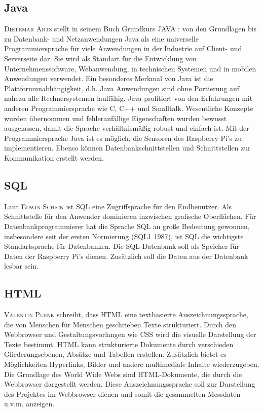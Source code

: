 \subsection{Java}\label{Java}

\textsc{Dietemar Abts} stellt in seinem Buch Grundkurs JAVA : von den Grundlagen bis zu Datenbank- und Netzanwendungen \cite{abts2015grundkurs} Java als eine universelle Programmiersprache für viele Anwendungen in der Industrie auf Client- und Serverseite dar.
Sie wird als Standart für die Entwicklung von Unternehmenssoftware, Webanwendung, in technischen Systemen und in mobilen Anwendungen verwendet.
Ein besonderes Merkmal von Java ist die Plattformunabhängigkeit, d.h. Java Anwendungen sind ohne Portierung auf nahezu alle Rechnersystemen 
lauffähig. Java profitiert von den Erfahrungen mit anderen Programmiersprache wie C, C++ und Smalltalk. Wesentliche Konzepte wurden übernommen und fehleranfällige Eigenschaften wurden bewusst ausgelassen, damit die Sprache verhältnismäßig robust und einfach ist. Mit der Programmiersprache Java ist es möglich, die Sensoren des Raspberry Pi's zu implementieren. Ebenso können Datenbankschnittstellen und Schnittstellen zur Kommunikation erstellt werden.

\subsection{\ac{SQL}}
Laut \textsc{Edwin Schick}\cite{schicker2017datenbanken} ist \ac{SQL} eine Zugriffsprache für den Endbenutzer. Als Schnittstelle für den Anwender dominieren inzwischen grafische Oberflächen. Für Datenbankprogrammierer hat die Sprache \ac{SQL} an große Bedeutung gewonnen, insbesondere seit der ersten Normierung (SQL1 1987), ist \ac{SQL} die wichtigste Standartsprache für Datenbanken. Die \ac{SQL} Datenbank soll als Speicher für Daten der Raspberry Pi's dienen. Zusätzlich soll die Daten aus der Datenbank lesbar sein.
\subsection{\ac{HTML}}
\textsc{Valentin Plenk}\cite{plenk2017angewandte} schreibt, dass \ac{HTML} eine textbasierte Auszeichnungssprache, die von Menschen für Menschen geschrieben Texte strukturiert. Durch den Webbrowser und Gestaltungsvorlangen wie \ac{CSS} wird die visuelle Darstellung der Texte bestimmt. \ac{HTML} kann strukturierte Dokumente durch verschieden Gliederungsebenen, Absätze und Tabellen erstellen. Zusätzlich bietet es Möglichkeiten Hyperlinks, Bilder und andere multimediale Inhalte wiederzugeben. Die Grundlage des World Wide Webs sind \ac{HTML}-Dokumente, die durch die Webbrowser dargestellt werden. Diese Auszeichnungssprache soll zur Darstellung des Projektes im Webbrowser dienen und somit die gesammelten Messdaten u.v.m. anzeigen.

